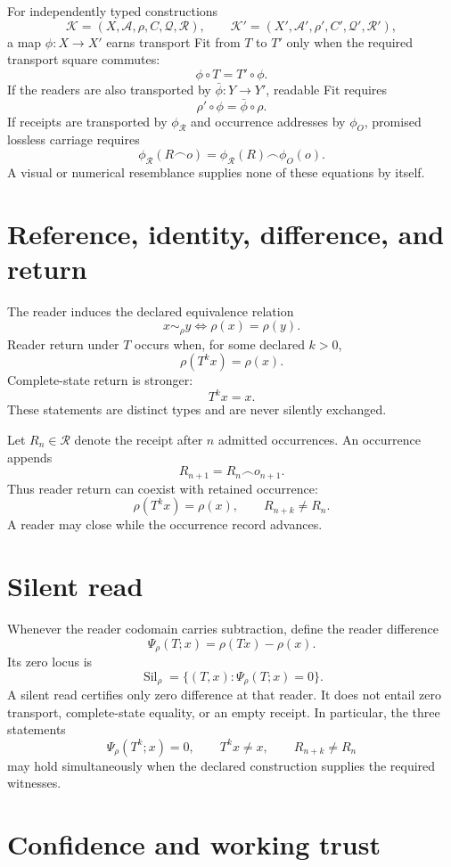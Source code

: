\documentclass[11pt]{article}
\newcommand{\Sil}{\operatorname{Sil}}
\begin{document}
For independently typed constructions
\[
\mathcal K=(X,\mathcal A,\rho,C,\mathcal Q,\mathcal R),
\qquad
\mathcal K'=(X',\mathcal A',\rho',C',\mathcal Q',\mathcal R'),
\]
a map $\phi:X\to X'$ earns transport Fit from $T$ to $T'$ only when the required transport square commutes:
\[
\boxed{\phi\circ T=T'\circ\phi.}
\]
If the readers are also transported by $\bar\phi:Y\to Y'$, readable Fit requires
\[
\boxed{\rho'\circ\phi=\bar\phi\circ\rho.}
\]
If receipts are transported by $\phi_{\mathcal R}$ and occurrence addresses by $\phi_O$, promised lossless carriage requires
\[
\boxed{
\phi_{\mathcal R}(R\frown o)
=
\phi_{\mathcal R}(R)\frown\phi_O(o).
}
\]
A visual or numerical resemblance supplies none of these equations by itself.

\section{Reference, identity, difference, and return}

The reader induces the declared equivalence relation
\[
x\sim_\rho y
\Longleftrightarrow
\rho(x)=\rho(y).
\]
Reader return under $T$ occurs when, for some declared $k>0$,
\[
\rho(T^k x)=\rho(x).
\]
Complete-state return is stronger:
\[
T^k x=x.
\]
These statements are distinct types and are never silently exchanged.

Let $R_n\in\mathcal R$ denote the receipt after $n$ admitted occurrences. An occurrence appends
\[
R_{n+1}=R_n\frown o_{n+1}.
\]
Thus reader return can coexist with retained occurrence:
\[
\boxed{
\rho(T^k x)=\rho(x),
\qquad
R_{n+k}\neq R_n.
}
\]
A reader may close while the occurrence record advances.

\section{Silent read}

Whenever the reader codomain carries subtraction, define the reader difference
\[
\Psi_\rho(T;x)=\rho(Tx)-\rho(x).
\]
Its zero locus is
\[
\Sil_\rho
=
\{(T,x):\Psi_\rho(T;x)=0\}.
\]
A silent read certifies only zero difference at that reader. It does not entail zero transport, complete-state equality, or an empty receipt. In particular, the three statements
\[
\Psi_\rho(T^k;x)=0,
\qquad
T^k x\neq x,
\qquad
R_{n+k}\neq R_n
\]
may hold simultaneously when the declared construction supplies the required witnesses.

\section{Confidence and working trust}
\end{document}
